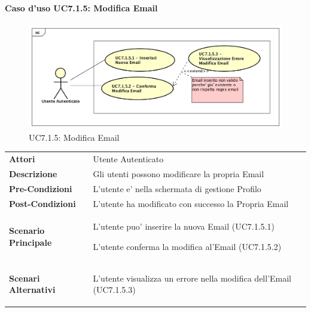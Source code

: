 \paragraph{Caso d'uso UC7.1.5:  Modifica Email}
\label{UC7_1_5}
\begin{figure}[ht]
	\centering
	\includegraphics[scale=0.45]{UML/UC7_1_5.png}
	\caption{UC7.1.5:  Modifica Email}
\end{figure}
\FloatBarrier
\begin{tabular}{ l | p{11cm}}
	\hline
	\rowcolor{Gray}
	 \multicolumn{2}{c}{UC7.1.5 - Modifica Email} \\
	 \hline
		\textbf{Attori} & Utente Autenticato \\
	\textbf{Descrizione} & Gli utenti possono modificare la propria Email\\
	\textbf{Pre-Condizioni} & L'utente e' nella schermata di gestione Profilo\\
	\textbf{Post-Condizioni} & L'utente ha modificato con successo la Propria Email\\
	\textbf{Scenario Principale} & 
	\begin{enumerate*}[label=(\arabic*.),itemjoin={\newline}]
		\item L'utente puo' inserire la nuova Email (UC7.1.5.1)
		\item L'utente conferma la modifica al'Email (UC7.1.5.2)
	\end{enumerate*}\\
	\textbf{Scenari Alternativi} & 
	\begin{enumerate*}[label=(\arabic*.),itemjoin={\newline}]
		\item L'utente visualizza un errore nella modifica dell'Email (UC7.1.5.3)
	\end{enumerate*}\\
\end{tabular}

